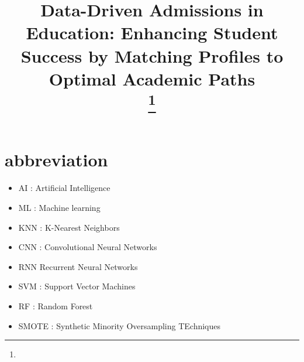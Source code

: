 \documentclass[conference]{IEEEtran}
\begin{document}
\title{Data-Driven Admissions in Education: Enhancing Student Success by Matching Profiles to Optimal Academic Paths\\
{\footnotesize \textsuperscript{}}
\thanks{}
}

\author{
}
\maketitle

\section*{abbreviation}
\begin{itemize}
    \item[] AI : Artificial Intelligence
    \item[] ML : Machine learning
    \item[] KNN : K-Nearest Neighbors
    \item[] CNN : Convolutional Neural Networks 
    \item[] RNN Recurrent Neural Networks 
    \item[] SVM : Support Vector Machines 
    \item[] RF : Random Forest
    \item[] SMOTE : Synthetic Minority Oversampling TEchniques
\end{itemize}


\vspace{16pt}
\end{document}
